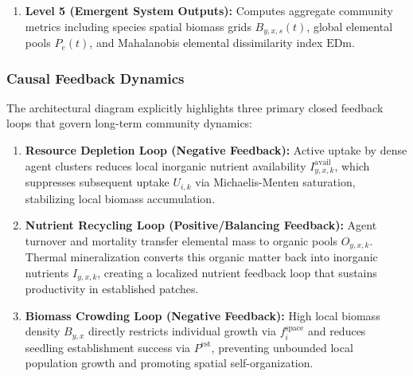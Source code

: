 \documentclass[11pt,a4paper]{article}
\begin{document}
\begin{enumerate}
\begin{itemize}
        \item \textbf{[P8] Multi-Tier Mortality Filtering:} Filters agent survival through sequential viability, periodic catastrophe, weak niche-dependent, and strong mass-dependent mortality filters.
        \item \textbf{[P9] Turnover Recycling and Mineralization:} Recycles elemental losses $L_{i,e}$ into organic soil pools $O_{y,x,k}$, which undergo temperature-dependent mineralization to replenish inorganic pools:
        \begin{equation}
        \Phi^{\text{min}}_{y,x,k} = O^{\text{tot}}_{y,x,k} \cdot m_{\text{min}} \cdot \left(1 + \beta_m (T_{y,x} - 0.5)\right)
        \end{equation}
        \item \textbf{[P10] Dispersal and Establishment:} Disperses offspring seeds on a 2D torus ($y_{\text{off}} = (y_i + \Delta y) \pmod H, x_{\text{off}} = (x_i + \Delta x) \pmod W$) subject to density-dependent establishment probability $P^{\text{est}} = \max(0, 1 - B_{\text{off}}/K_{\text{bio}})$.
    \end{itemize}
    
    \item \textbf{Level 5 (Emergent System Outputs):} Computes aggregate community metrics including species spatial biomass grids $B_{y,x,s}(t)$, global elemental pools $P_e(t)$, and Mahalanobis elemental dissimilarity index $\text{EDm}$.
\end{enumerate}

\subsubsection{Causal Feedback Dynamics}
The architectural diagram explicitly highlights three primary closed feedback loops that govern long-term community dynamics:

\begin{enumerate}
    \item \textbf{Resource Depletion Loop (Negative Feedback):} Active uptake by dense agent clusters reduces local inorganic nutrient availability $I^{\text{avail}}_{y,x,k}$, which suppresses subsequent uptake $U_{i,k}$ via Michaelis-Menten saturation, stabilizing local biomass accumulation.
    
    \item \textbf{Nutrient Recycling Loop (Positive/Balancing Feedback):} Agent turnover and mortality transfer elemental mass to organic pools $O_{y,x,k}$. Thermal mineralization converts this organic matter back into inorganic nutrients $I_{y,x,k}$, creating a localized nutrient feedback loop that sustains productivity in established patches.
    
    \item \textbf{Biomass Crowding Loop (Negative Feedback):} High local biomass density $B_{y,x}$ directly restricts individual growth via $f_i^{\text{space}}$ and reduces seedling establishment success via $P^{\text{est}}$, preventing unbounded local population growth and promoting spatial self-organization.
\end{enumerate}
\end{document}
